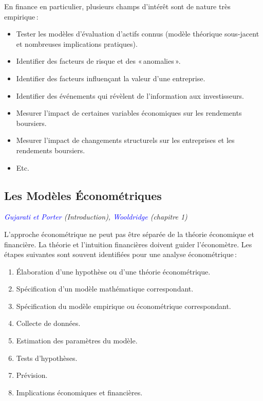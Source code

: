 \documentclass[14pt]{extarticle} %
\newcommand{\livre}[1]{\textcolor{blue}{#1}}
\begin{document}
En finance en particulier, plusieurs champs d’intérêt sont de nature très empirique :

\begin{itemize}
    \item Tester les modèles d’évaluation d’actifs connus (modèle théorique sous-jacent et nombreuses implications pratiques).
    \item Identifier des facteurs de risque et des « anomalies ».
    \item Identifier des facteurs influençant la valeur d’une entreprise.
    \item Identifier des événements qui révèlent de l’information aux investisseurs.
    \item Mesurer l’impact de certaines variables économiques sur les rendements boursiers.
    \item Mesurer l’impact de changements structurels sur les entreprises et les rendements boursiers.
    \item Etc.
\end{itemize}

\subsection{Les Modèles Économétriques}

\textit{\livre{Gujarati et Porter} (Introduction), \livre{Wooldridge} (chapitre 1)}

L’approche économétrique ne peut pas être séparée de la théorie économique et financière. La théorie et l’intuition financières doivent guider l’économètre. Les étapes suivantes sont souvent identifiées pour une analyse économétrique :

\begin{enumerate}
    \item Élaboration d’une hypothèse ou d’une théorie économétrique.
    \item Spécification d’un modèle mathématique correspondant.
    \item Spécification du modèle empirique ou économétrique correspondant.
    \item Collecte de données.
    \item Estimation des paramètres du modèle.
    \item Tests d’hypothèses.
    \item Prévision.
    \item Implications économiques et financières.
\end{enumerate}
\end{document}
